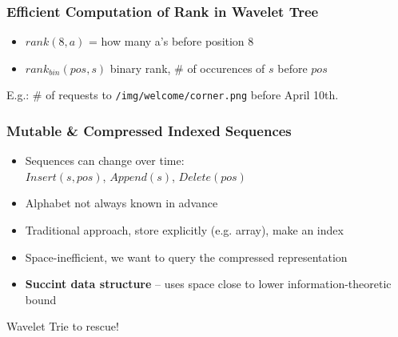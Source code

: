 \documentclass{beamer}
\begin{document}
\begin{frame}
\frametitle{Efficient Computation of Rank in Wavelet Tree}
\begin{itemize}
  \item $rank(8, a)$ = how many a's before position 8
  \item $rank_{bin}(pos, s)$ binary rank, \# of occurences of $s$ before $pos$  
\end{itemize}
\begin{figure}
\end{figure}
{\small E.g.: \# of requests to \texttt{/img/welcome/corner.png} before April 10th.}
\end{frame}


\begin{frame}
\frametitle{Mutable \& Compressed Indexed Sequences}
\begin{itemize}
  \item Sequences can change over time:\\$Insert(s, pos)$, $Append(s)$, $Delete(pos)$
  \item Alphabet not always known in advance 
\end{itemize}
\vspace{10pt}
\begin{itemize}
  \item Traditional approach, store explicitly (e.g. array), make an index
  \item Space-inefficient, we want to query the compressed representation
  \item {\bf Succint data structure} -- uses space close to lower information-theoretic bound
\end{itemize}
\vspace{10pt}
\hspace{10pt}
Wavelet Trie to rescue!
\end{frame}
\end{document}
